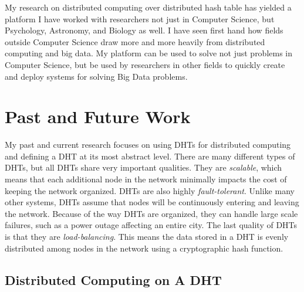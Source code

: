 \documentclass[letterpaper]{article}
\begin{document}
My research on distributed computing over distributed hash table has yielded a platform 
I have worked with researchers not just in Computer Science, but Psychology, Astronomy, and Biology as well.
I have seen first hand how fields outside Computer Science draw more and more heavily from distributed computing and big data.
My platform can be used to solve not just problems in Computer Science, but be used by researchers in other fields to quickly create and deploy systems for solving Big Data problems.



%
%
%

\section{Past and Future Work}

My past and current research focuses on using DHTs for distributed computing \cite{chordreduce} and defining a DHT at its most abstract level.
There are many different types of DHTs, but all DHTs share very important qualities.
They are \textit{scalable}, which means that each additional node in the network minimally impacts the cost of keeping the network organized.
DHTs are also highly \textit{fault-tolerant}.
Unlike many other systems, DHTs assume that nodes will be continuously entering and leaving the network.
Because of the way DHTs are organized, they can handle large scale failures, such as a power outage affecting an entire city.
The last quality of DHTs is that they are \textit{load-balancing}. 
This means the data stored in a DHT is evenly distributed among nodes in the network using a cryptographic hash function.


\subsection{Distributed Computing on A DHT}
\end{document}

